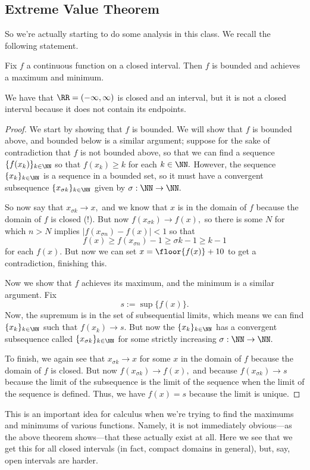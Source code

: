 \documentclass[../notes.tex]{subfiles}
\begin{document}
\subsection{Extreme Value Theorem}
So we're actually starting to do some analysis in this class. We recall the following statement.
\begin{theorem}
	Fix $f$ a continuous function on a closed interval. Then $f$ is bounded and achieves a maximum and minimum.
\end{theorem}
\begin{warn}
	We have that $\RR=(-\infty,\infty)$ is closed and an interval, but it is not a closed interval because it does not contain its endpoints.
\end{warn}
\begin{proof}
	We start by showing that $f$ is bounded. We will show that $f$ is bounded above, and bounded below is a similar argument; suppose for the sake of contradiction that $f$ is not bounded above, so that we can find a sequence $\{f(x_k)\}_{k\in\NN}$ so that $f(x_k)\ge k$ for each $k\in\NN.$ However, the sequence $\{x_k\}_{k\in\NN}$ is a sequence in a bounded set, so it must have a convergent subsequence $\{x_{\sigma k}\}_{k\in\NN}$ given by $\sigma:\NN\to\NN.$

	So now say that $x_{\sigma k}\to x,$ and we know that $x$ is in the domain of $f$ because the domain of $f$ is closed (!). But now $f(x_{\sigma k})\to f(x),$ so there is some $N$ for which $n>N$ implies $|f(x_{\sigma n})-f(x)|<1$ so that
	\[f(x)\ge f(x_{\sigma n})-1\ge\sigma k-1\ge k-1\]
	for each $f(x).$ But now we can set $x=\floor{f(x)}+10$ to get a contradiction, finishing this.

	Now we show that $f$ achieves its maximum, and the minimum is a similar argument. Fix
	\[s:=\sup\{f(x)\}.\]
	Now, the supremum is in the set of subsequential limits, which means we can find $\{x_k\}_{k\in\NN}$ such that $f(x_k)\to s.$ But now the $\{x_k\}_{k\in\NN}$ has a convergent subsequence called $\{x_{\sigma k}\}_{k\in\NN}$ for some strictly increasing $\sigma:\NN\to\NN.$

	To finish, we again see that $x_{\sigma k}\to x$ for some $x$ in the domain of $f$ because the domain of $f$ is closed. But now $f(x_{\sigma k})\to f(x),$ and because $f(x_{\sigma k})\to s$ because the limit of the subsequence is the limit of the sequence when the limit of the sequence is defined. Thus, we have $f(x)=s$ because the limit is unique.
\end{proof}
This is an important idea for calculus when we're trying to find the maximums and minimums of various functions. Namely, it is not immediately obvious---as the above theorem shows---that these actually exist at all. Here we see that we get this for all closed intervals (in fact, compact domains in general), but, say, open intervals are harder.
\end{document}
